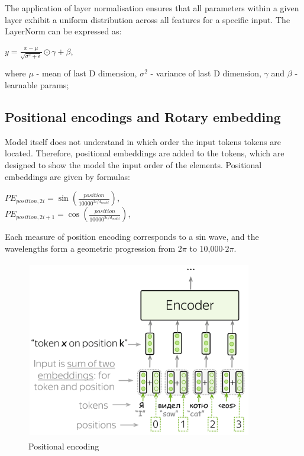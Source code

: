 \documentclass[PMI,VKR]{HSEUniversity}
\begin{document}
The application of layer normalisation ensures that all parameters within a given layer exhibit a uniform distribution across all features for a specific input.
The LayerNorm can be expressed as:
\begin{center}
    $y = \frac{x - \mu}{\sqrt{\sigma^{2} + \epsilon}} \odot \gamma + \beta$,
\end{center}
where $\mu$ - mean of last D dimension, $\sigma^2$ - variance of last D dimension, $\gamma$ and $\beta$ - learnable params;
      

\subsection{Positional encodings and Rotary embedding}

Model itself does not understand in which order the input tokens tokens are located. 
Therefore, positional embeddings are added to the tokens, which are designed to show the model the input order of the elements.
Positional embeddings are given by formulas:
\begin{center}
    $PE_{position, 2i} = \sin(\frac{position}{10000^{2i/d_{model}}})$, \\
    $PE_{position, 2i+1} = \cos(\frac{position}{10000^{2i/d_{model}}})$, \\
\end{center}

Each measure of position encoding corresponds to a sin wave, and the wavelengths form a geometric progression from $2\pi$ to 10,000$\cdot 2\pi$.

\begin{figure}[h]
    \centering
    \includegraphics[scale=1]{img/pos_encoding.png}
    \caption{Positional encoding}
\end{figure}
\end{document}
